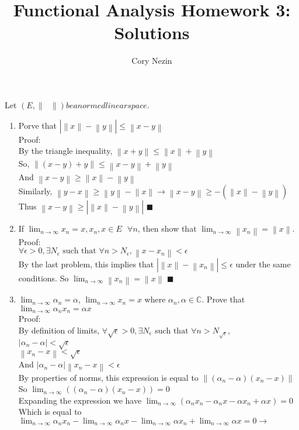 \documentclass[12pt]{article}
\title{Functional Analysis Homework 3: Solutions}
\author{Cory Nezin}
\newcommand{\norm}[1]{\left \lVert#1\right\rVert}
\begin{document}
\maketitle
Let $(E,\norm{\text{ }}) be a normed linear space$.
\begin{enumerate}
\item Porve that $|\norm{x}-\norm{y}| \leq \norm{x-y}$\\
Proof:\\
By the triangle inequality, $\norm{x+y} \leq \norm{x} + \norm{y}$\\
So, $\norm{(x-y)+y} \leq \norm{x-y} + \norm{y}$\\
And $\norm{x-y} \geq \norm{x}-\norm{y}$\\
Similarly, $\norm{y-x} \geq \norm{y}-\norm{x} \rightarrow \norm{x-y} \geq -(\norm{x}-\norm{y})$
Thus $\norm{x-y} \geq |\norm{x}-\norm{y}|$ $\blacksquare$
\item If $\lim_{n\to\infty}x_n = x, x_n,x \in E \text{ }\forall n$, then show that $\lim_{n\to\infty}\norm{x_n} = \norm{x}$.\\
Proof:\\
$\forall \epsilon > 0, \exists N_\epsilon \text{ such that } \forall n > N_\epsilon, \norm{x-x_n} < \epsilon$\\
By the last problem, this implies that $|\norm{x}-\norm{x_n}| \leq \epsilon$ under the same conditions.  So $\lim_{n\to\infty}\norm{x_n} = \norm{x}$ $\blacksquare $
\item $\lim_{n\to\infty}\alpha_n = \alpha$, $\lim_{n\to\infty}x_n = x$ where $\alpha_n,\alpha \in \mathbb{C}$.  Prove that $\lim_{n\to\infty}\alpha_nx_n = \alpha x$\\
Proof:\\
By definition of limits, 
$\forall \sqrt{\epsilon} > 0, \exists N_\epsilon \text{ such that } \forall n > N_{\sqrt{\epsilon}}$,\\
$|\alpha_n-\alpha| < \sqrt{\epsilon}$\\
$\norm{x_n-x} < \sqrt{\epsilon}$\\
And $|\alpha_n-\alpha| \norm{x_n-x} < \epsilon$\\
By properties of norms, this expression is equal to $\norm{(\alpha_n-\alpha)(x_n-x)}$\\
So $\lim_{n\to\infty}((\alpha_n-\alpha)(x_n-x)) = 0$\\
Expanding the expression we have $\lim_{n\to\infty}(\alpha_nx_n - \alpha_nx-\alpha x_n + \alpha x) = 0$\\
Which is equal to \\$\lim_{n\to\infty}\alpha_nx_n - \lim_{n\to\infty}\alpha_nx-\lim_{n\to\infty}\alpha x_n + \lim_{n\to\infty}\alpha x = 0 \rightarrow$\\

\end{enumerate}
\end{document}
